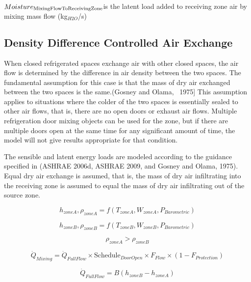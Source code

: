 \(Moistur{e_{{\rm{MixingFlowToReceivingZone}}}}\)is the latent load added to receiving zone air by mixing mass flow (kg\(_{H2O}\)/s)

\subsection{Density Difference Controlled Air Exchange}\label{density-difference-controlled-air-exchange}

When closed refrigerated spaces exchange air with other closed spaces, the air flow is determined by the difference in air density between the two spaces. The fundamental assumption for this case is that the mass of dry air exchanged between the two spaces is the same.(Gosney and Olama, ~1975{]} This assumption applies to situations where the colder of the two spaces is essentially sealed to other air flows, that is, there are no open doors or exhaust air flows. Multiple refrigeration door mixing objects can be used for the zone, but if there are multiple doors open at the same time for any significant amount of time, the model will not give results appropriate for that condition.

The sensible and latent energy loads are modeled according to the guidance specified in (ASHRAE 2006d, ASHRAE 2009, and Gosney and Olama, 1975).~ Equal dry air exchange is assumed, that is, the mass of dry air infiltrating into the receiving zone is assumed to equal the mass of dry air infiltrating out of the source zone.

\begin{equation}
h_{zoneA},\rho_{zoneA} = f (T_{zoneA},W_{zoneA},P_{Barometric})
\end{equation}

\begin{equation}
h_{zoneB},\rho_{zoneB} = f (T_{zoneB},W_{zoneB},P_{Barometric})
\end{equation}

\begin{equation}
\rho_{zoneA} > \rho_{zoneB}
\end{equation}

\begin{equation}
\dot{Q}_{Mixing} = \dot{Q}_{FullFlow} \times \text{Schedule}_{DoorOpen} \times F_{Flow} \times (1-F_{Protection})
\end{equation}

\begin{equation}
\dot{Q}_{FullFlow} = B (h_{zoneB}-h_{zoneA})
\end{equation}

